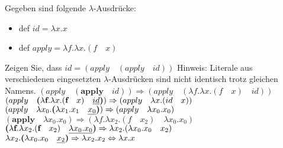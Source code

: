 \begin{card}
  Gegeben sind folgende $\lambda$-Ausdrücke:
  \begin{itemize}
  \item def $id = \lambda x.x$
  \item def $apply = \lambda f. \lambda x.(f \quad x)$
  \end{itemize}
  Zeigen Sie, dass $id = (apply \quad (apply \quad id))$
  \hr
  Hinweis: Literale aus verschiedenen eingesetzten $\lambda$-Ausdrücken sind nicht identisch trotz gleichen Namens.
  \vfill
  $(apply \quad (\textbf{apply} \quad id)) \Rightarrow (apply \quad (\lambda f. \lambda x.(f \quad x) \quad id))$
  \vfill
  $(apply \quad \textbf{(}\lambda \textbf{f}. \lambda x.(\textbf{f} \quad x) \quad \uline{id}\textbf{)}) \Rightarrow
  (apply \quad \lambda x.(id \quad x))$
  \vfill
  $(apply \quad \lambda x_{0}.\textbf{(} \lambda \textbf{$x_{1}$} . \textbf{$x_{1}$} \quad \uline{x_{0}} \textbf{)}) \Rightarrow
  (apply \quad \lambda x_{0}.x_{0})$
  \vfill
  $(\textbf{apply} \quad \lambda x_{0}.x_{0}) \Rightarrow (\lambda f. \lambda x_{2}.(f \quad x_{2}) \quad \lambda x_{0}.x_{0})$
  \vfill
  $\textbf{(}\lambda \textbf{f}. \lambda x_{2}.(\textbf{f} \quad x_{2}) \quad \uline{\lambda x_{0}.x_{0}} \textbf{)} \Rightarrow
  \lambda x_{2}.(\lambda x_{0}.x_{0} \quad x_{2})$
  \vfill
  $\lambda x_{2}.\textbf{(}\lambda \textbf{$x_{0}$}.\textbf{$x_{0}$} \quad \uline{x_{2}} \textbf{)} \Rightarrow
  \lambda x_{2}.x_{2} \Leftrightarrow \lambda x.x$
\end{card}

